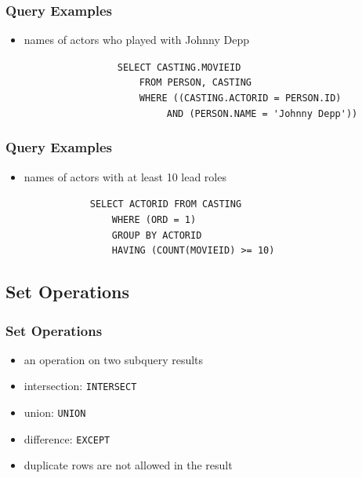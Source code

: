 \documentclass[dvipsnames]{beamer}
\theoremstyle{plain}
\begin{document}
\begin{frame}[fragile]
  \frametitle{Query Examples}

  \begin{itemize}
    \item names of actors who played with Johnny Depp

    \medskip
{}
~~~~~~~~~~~~~~~~~\lstinline!SELECT CASTING.MOVIEID!\\
~~~~~~~~~~~~~~~~~~~~~\lstinline!FROM PERSON, CASTING!\\
~~~~~~~~~~~~~~~~~~~~~\lstinline!WHERE ((CASTING.ACTORID = PERSON.ID)!\\
~~~~~~~~~~~~~~~~~~~~~~~~~~\lstinline!AND (PERSON.NAME = 'Johnny Depp'))!\\
  \end{itemize}
\end{frame}

\begin{frame}[fragile]
  \frametitle{Query Examples}

  \begin{itemize}
    \item names of actors with at least 10 lead roles

    \medskip
{}
~~~~~~~~~~~~\lstinline!SELECT ACTORID FROM CASTING!\\
~~~~~~~~~~~~~~~~\lstinline!WHERE (ORD = 1)!\\
\pause
~~~~~~~~~~~~~~~~\lstinline!GROUP BY ACTORID!\\
\pause
~~~~~~~~~~~~~~~~\lstinline!HAVING (COUNT(MOVIEID) >= 10)!\\
  \end{itemize}
\end{frame}

\subsection{Set Operations}

\begin{frame}
  \frametitle{Set Operations}

  \begin{itemize}
    \item an operation on two subquery results

    \medskip
    \item intersection: \lstinline!INTERSECT!
    \item union: \lstinline!UNION!
    \item difference: \lstinline!EXCEPT!

    \medskip
    \item duplicate rows are not allowed in the result
  \end{itemize}
\end{frame}
\end{document}

